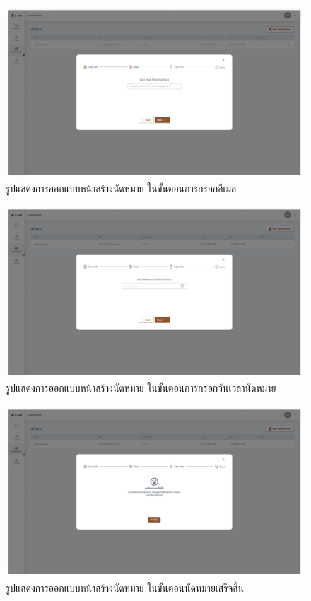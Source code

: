 \documentclass[12pt,oneside,openright,a4paper]{cpe-thai-project}
\begin{document}
\begin{figure}[!h]\centering
  \includegraphics[width=13cm]{./assets/userinterface/create-appointment-email.png}
  \caption{รูปแสดงการออกแบบหน้าสร้างนัดหมาย ในขั้นตอนการกรอกอีเมล}\label{fig:create-appointment-email}
\end{figure}

\begin{figure}[!h]\centering
  \includegraphics[width=13cm]{./assets/userinterface/create-appointment-datetime.png}
  \caption{รูปแสดงการออกแบบหน้าสร้างนัดหมาย ในขั้นตอนการกรอกวันเวลานัดหมาย}\label{fig:create-appointment-datetime}
\end{figure}

\begin{figure}[!h]\centering
  \includegraphics[width=13cm]{./assets/userinterface/create-appointment-done.png}
  \caption{รูปแสดงการออกแบบหน้าสร้างนัดหมาย ในขั้นตอนนัดหมายเสร็จสิ้น}\label{fig:create-appointment-done}
\end{figure}
\end{document}
